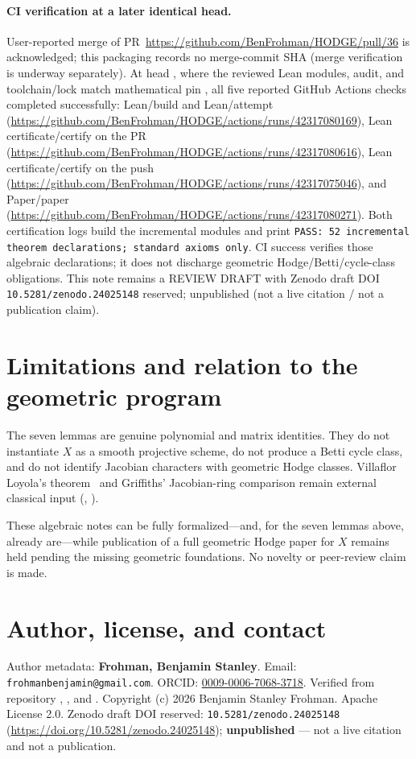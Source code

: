 \documentclass[11pt,a4paper]{article}
\newcommand{\lean}[1]{\texttt{\detokenize{#1}}}
\theoremstyle{definition}
\begin{document}
\paragraph{CI verification at a later identical head.}
User-reported merge of PR~\url{https://github.com/BenFrohman/HODGE/pull/36}
is acknowledged; this packaging records no merge-commit SHA (merge
verification is underway separately). At head
, where the reviewed Lean
modules, audit, and toolchain/lock match mathematical pin
, all five reported GitHub
Actions checks completed successfully:
Lean/build and Lean/attempt
(\url{https://github.com/BenFrohman/HODGE/actions/runs/42317080169}),
Lean certificate/certify on the PR
(\url{https://github.com/BenFrohman/HODGE/actions/runs/42317080616}),
Lean certificate/certify on the push
(\url{https://github.com/BenFrohman/HODGE/actions/runs/42317075046}),
and Paper/paper
(\url{https://github.com/BenFrohman/HODGE/actions/runs/42317080271}).
Both certification logs build the incremental modules and print
\texttt{PASS: 52 incremental theorem declarations; standard axioms only}.
CI success verifies those algebraic declarations; it does not discharge
geometric Hodge/Betti/cycle-class obligations. This note remains a
REVIEW DRAFT with Zenodo draft DOI \texttt{10.5281/zenodo.24025148} reserved; unpublished (not a live citation / not a publication claim).

\section{Limitations and relation to the geometric program}

The seven lemmas are genuine polynomial and matrix identities. They do not
instantiate $X$ as a smooth projective scheme, do not produce a Betti cycle
class, and do not identify Jacobian characters with geometric Hodge classes.
Villaflor Loyola's theorem~\cite{Villaflor2021} and Griffiths' Jacobian-ring
comparison remain external classical input
(\lean{NOTICE.md}, ).

These algebraic notes can be fully formalized---and, for the seven lemmas
above, already are---while publication of a full geometric Hodge paper for
$X$ remains held pending the missing geometric foundations. No novelty or
peer-review claim is made.

\section*{Author, license, and contact}
Author metadata: \textbf{Frohman, Benjamin Stanley}.
Email: \texttt{frohmanbenjamin@gmail.com}.
ORCID: \href{https://orcid.org/0009-0006-7068-3718}{0009-0006-7068-3718}.
Verified from repository , , and
.
Copyright (c) 2026 Benjamin Stanley Frohman. Apache License 2.0.
Zenodo draft DOI reserved: \texttt{10.5281/zenodo.24025148} (\url{https://doi.org/10.5281/zenodo.24025148}); \textbf{unpublished} --- not a live citation and not a publication.



\end{document}
